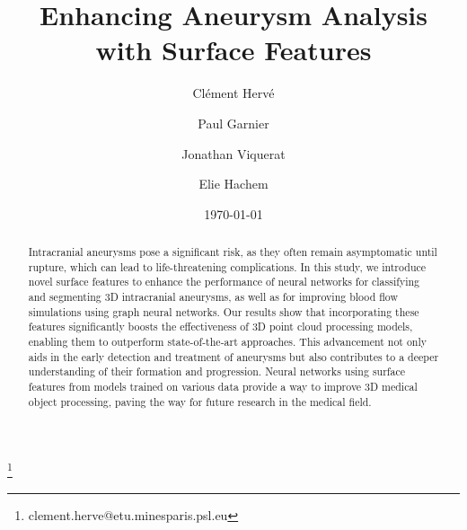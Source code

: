 \documentclass[%
 reprint,
 amsmath,amssymb,
 aps,
 floatfix,
 nofootinbib,
]{revtex4-2}
\begin{document}

\title{Enhancing Aneurysm Analysis with Surface Features}

\author{Clément Hervé}
\thanks{clement.herve@etu.minesparis.psl.eu}

\author{Paul Garnier}

\author{Jonathan Viquerat}

\author{Elie Hachem}

\date{\today}

\begin{abstract}
Intracranial aneurysms pose a significant risk, as they often remain asymptomatic until rupture, which can lead to life-threatening complications. In this study, we introduce novel surface features to enhance the performance of neural networks for classifying and segmenting 3D intracranial aneurysms, as well as for improving blood flow simulations using graph neural networks. Our results show that incorporating these features significantly boosts the effectiveness of 3D point cloud processing models, enabling them to outperform state-of-the-art approaches. This advancement not only aids in the early detection and treatment of aneurysms but also contributes to a deeper understanding of their formation and progression. Neural networks using surface features from models trained on various data provide a way to improve 3D medical object processing, paving the way for future research in the medical field.
\end{abstract}

\makeatletter
\renewcommand{\MakeTextUppercase}[1]{#1}
\renewcommand{\section}{\@startsection{section}{1}{0pt}{-3.5ex plus -1ex minus -.2ex}{2.3ex plus .2ex}{\normalfont\large\bfseries}}
\renewcommand{\subsection}{\@startsection{subsection}{2}{0pt}{-3.25ex plus -1ex minus -.2ex}{1.5ex plus .2ex}{\normalfont\bfseries\raggedright}}
\renewcommand{\thesection}{\arabic{section}}
\renewcommand{\thesubsection}{\thesection.\arabic{subsection}}
\renewcommand{\bibsection}{\section*{References}}
\makeatother
\end{document}
